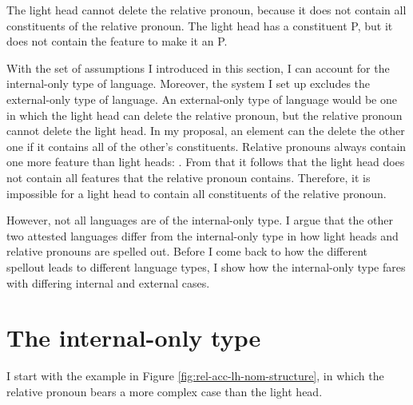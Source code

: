 The light head cannot delete the relative pronoun, because it does not contain all constituents of the relative pronoun.
The light head has a constituent P, but it does not contain the feature  to make it an P.

With the set of assumptions I introduced in this section, I can account for the internal-only type of language. Moreover, the system I set up excludes the external-only type of language. An external-only type of language would be one in which the light head can delete the relative pronoun, but the relative pronoun cannot delete the light head. In my proposal, an element can the delete the other one if it contains all of the other's constituents. Relative pronouns always contain one more feature than light heads: . From that it follows that the light head does not contain all features that the relative pronoun contains. Therefore, it is impossible for a light head to contain all constituents of the relative pronoun.

However, not all languages are of the internal-only type. I argue that the other two attested languages differ from the internal-only type in how light heads and relative pronouns are spelled out. Before I come back to how the different spellout leads to different language types, I show how the internal-only type fares with differing internal and external cases.


\section{The internal-only type}

I start with the example in Figure \ref{fig:rel-acc-lh-nom-structure}, in which the relative pronoun bears a more complex case than the light head.

